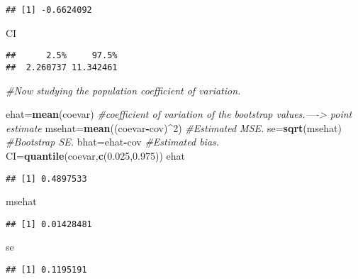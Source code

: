\documentclass[]{article}
\newenvironment{Shaded}{\begin{snugshade}}{\end{snugshade}}
\newcommand{\CommentTok}[1]{\textcolor[rgb]{0.56,0.35,0.01}{\textit{#1}}}
\newcommand{\DecValTok}[1]{\textcolor[rgb]{0.00,0.00,0.81}{#1}}
\newcommand{\FloatTok}[1]{\textcolor[rgb]{0.00,0.00,0.81}{#1}}
\newcommand{\KeywordTok}[1]{\textcolor[rgb]{0.13,0.29,0.53}{\textbf{#1}}}
\newcommand{\NormalTok}[1]{#1}
\newcommand{\OperatorTok}[1]{\textcolor[rgb]{0.81,0.36,0.00}{\textbf{#1}}}
\begin{document}
\begin{verbatim}
## [1] -0.6624092
\end{verbatim}

\begin{Shaded}
\begin{Highlighting}[]
\NormalTok{CI}
\end{Highlighting}
\end{Shaded}

\begin{verbatim}
##      2.5%     97.5% 
##  2.260737 11.342461
\end{verbatim}

\begin{Shaded}
\begin{Highlighting}[]
\CommentTok{#Now studying the  population coefficient of variation.}

\NormalTok{ehat=}\KeywordTok{mean}\NormalTok{(coevar) }\CommentTok{#coefficient of variation of the bootstrap values.----> point estimate}
\NormalTok{msehat=}\KeywordTok{mean}\NormalTok{((coevar}\OperatorTok{-}\NormalTok{cov)}\OperatorTok{^}\DecValTok{2}\NormalTok{) }\CommentTok{#Estimated MSE.}
\NormalTok{se=}\KeywordTok{sqrt}\NormalTok{(msehat) }\CommentTok{#Bootstrap SE.}
\NormalTok{bhat=ehat}\OperatorTok{-}\NormalTok{cov }\CommentTok{#Estimated bias.}
\NormalTok{CI=}\KeywordTok{quantile}\NormalTok{(coevar,}\KeywordTok{c}\NormalTok{(}\FloatTok{0.025}\NormalTok{,}\FloatTok{0.975}\NormalTok{))}
\NormalTok{ehat}
\end{Highlighting}
\end{Shaded}

\begin{verbatim}
## [1] 0.4897533
\end{verbatim}

\begin{Shaded}
\begin{Highlighting}[]
\NormalTok{msehat}
\end{Highlighting}
\end{Shaded}

\begin{verbatim}
## [1] 0.01428481
\end{verbatim}

\begin{Shaded}
\begin{Highlighting}[]
\NormalTok{se}
\end{Highlighting}
\end{Shaded}

\begin{verbatim}
## [1] 0.1195191
\end{verbatim}
\end{document}
